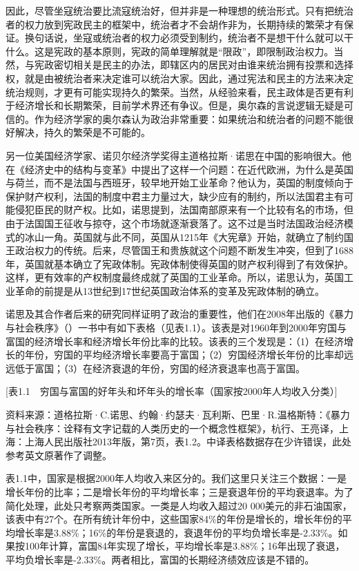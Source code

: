因此，尽管坐寇统治要比流寇统治好，但并非是一种理想的统治形式。只有把统治者的权力放到宪政民主的框架中，统治者才不会胡作非为，长期持续的繁荣才有保证。换句话说，坐寇或统治者的权力必须受到制约，统治者不是想干什么就可以干什么。这是宪政的基本原则，宪政的简单理解就是“限政”，即限制政治权力。当然，与宪政密切相关是民主的办法，即辖区内的居民对由谁来统治拥有投票和选择权，就是由被统治者来决定谁可以统治大家。因此，通过宪法和民主的方法来决定统治规则，才更有可能实现持久的繁荣。当然，从经验来看，民主政体是否更有利于经济增长和长期繁荣，目前学术界还有争议。但是，奥尔森的言说逻辑无疑是可信的。作为经济学家的奥尔森认为政治非常重要：如果统治和统治者的问题不能很好解决，持久的繁荣是不可能的。

另一位美国经济学家、诺贝尔经济学奖得主道格拉斯·诺思在中国的影响很大。他在《经济史中的结构与变革》中提出了这样一个问题：在近代欧洲，为什么是英国与荷兰，而不是法国与西班牙，较早地开始工业革命？他认为，英国的制度倾向于保护财产权利，法国的制度中君主力量过大，缺少应有的制约，所以法国君主有可能侵犯臣民的财产权。比如，诺思提到，法国南部原来有一个比较有名的市场，但由于法国国王征收与掠夺，这个市场就逐渐衰落了。这不过是当时法国政治经济模式的冰山一角。英国就与此不同，英国从1215年《大宪章》开始，就确立了制约国王政治权力的传统。后来，尽管国王和贵族就这个问题不断发生冲突，但到了1688年，英国就基本确立了宪政体制。宪政体制使得英国的财产权利得到了有效保护。这样，更有效率的产权制度最终成就了英国的工业革命。所以，诺思认为，英国工业革命的前提是从13世纪到17世纪英国政治体系的变革及宪政体制的确立。

诺思及其合作者后来的研究同样证明了政治的重要性，他们在2008年出版的《暴力与社会秩序》（）一书中有如下表格（见表1.1）。该表是对1960年到2000年穷国与富国的经济增长率和经济增长年份比率的比较。该表的三个发现是：（1）在经济增长的年份，穷国的平均经济增长率要高于富国；（2）穷国经济增长年份的比率却远远低于富国；（3）在经济衰退的年份，穷国的经济衰退率也高于富国。

[表1.1　穷国与富国的好年头和坏年头的增长率（国家按2000年人均收入分类）]

资料来源：道格拉斯·C.诺思、约翰·约瑟夫·瓦利斯、巴里·R.温格斯特：《暴力与社会秩序：诠释有文字记载的人类历史的一个概念性框架》，杭行、王亮译，上海：上海人民出版社2013年版，第7页，表1.2。中译表格数据存在少许错误，此处参考英文原著作了调整。

表1.1中，国家是根据2000年人均收入来区分的。我们这里只关注三个数据：一是增长年份的比率；二是增长年份的平均增长率；三是衰退年份的平均衰退率。为了简化处理，此处只考察两类国家。一类是人均收入超过20 000美元的非石油国家，该表中有27个。在所有统计年份中，这些国家84\%的年份是增长的，增长年份的平均增长率是3.88\%；16\%的年份是衰退的，衰退年份的平均负增长率是-2.33\%。如果按100年计算，富国84年实现了增长，平均增长率是3.88\%；16年出现了衰退，平均负增长率是-2.33\%。两者相比，富国的长期经济绩效应该是不错的。

